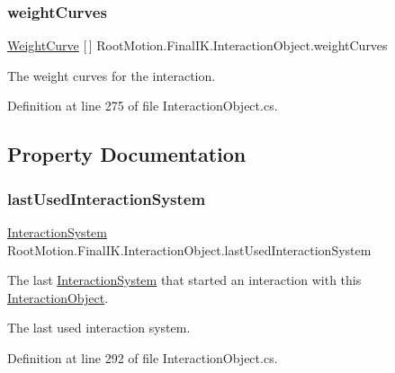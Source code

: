 \subsubsection{\texorpdfstring{weight\+Curves}{weightCurves}}
{\footnotesize\ttfamily \mbox{\hyperlink{class_root_motion_1_1_final_i_k_1_1_interaction_object_1_1_weight_curve}{Weight\+Curve}} \mbox{[}$\,$\mbox{]} Root\+Motion.\+Final\+I\+K.\+Interaction\+Object.\+weight\+Curves}



The weight curves for the interaction. 



Definition at line 275 of file Interaction\+Object.\+cs.



\subsection{Property Documentation}
\mbox{\label{class_root_motion_1_1_final_i_k_1_1_interaction_object_a2c0ba73ce6e5b272ef88b3b6a950b9a9}} 
\subsubsection{\texorpdfstring{last\+Used\+Interaction\+System}{lastUsedInteractionSystem}}
{\footnotesize\ttfamily \mbox{\hyperlink{class_root_motion_1_1_final_i_k_1_1_interaction_system}{Interaction\+System}} Root\+Motion.\+Final\+I\+K.\+Interaction\+Object.\+last\+Used\+Interaction\+System\hspace{0.3cm}{\ttfamily [get]}}



The last \mbox{\hyperlink{class_root_motion_1_1_final_i_k_1_1_interaction_system}{Interaction\+System}} that started an interaction with this \mbox{\hyperlink{class_root_motion_1_1_final_i_k_1_1_interaction_object}{Interaction\+Object}}. 

The last used interaction system.

Definition at line 292 of file Interaction\+Object.\+cs.

